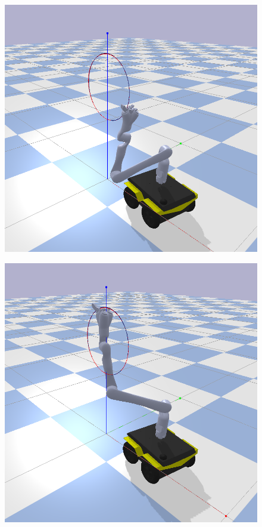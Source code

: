 \begin{figure}[ht]
	\begin{minipage}[t]{0.3\linewidth}
		\includegraphics[width=1\textwidth]{images/jjsim1-1.png}
		\label{fig:jjsim1-1}
	\end{minipage}
	\hfill
	\begin{minipage}[t]{0.3\linewidth}
		\includegraphics[width=1\textwidth]{images/jjsim1-2.png}

\end{minipage}
\end{figure}
